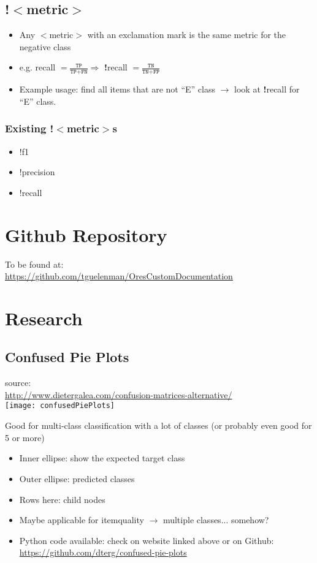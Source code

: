 \documentclass[12pt,a4paper]{article}
\begin{document}
\subsection{!$<$metric$>$}
\begin{itemize}
\item Any $<$metric$>$ with an exclamation mark is the same metric for the negative class
\item e.g. recall $= \frac{\texttt{TP}}{\texttt{TP} + \texttt{FN}} \Rightarrow$ \textbf{!}recall  $= \frac{\texttt{TN}}{\texttt{TN} + \texttt{FP}}$
\item Example usage: find all items that are not ``E'' class $\rightarrow$ look at \textbf{!}recall for ``E'' class.
\end{itemize}
\subsubsection{Existing !$<$metric$>$s}
\begin{itemize}
\item !f1
\item !precision
\item !recall
\end{itemize}
\section{Github Repository}
To be found at:\\
\url{https://github.com/tguelenman/OresCustomDocumentation}

\section{Research}
\subsection{Confused Pie Plots}
source:\\
\url{http://www.dietergalea.com/confusion-matrices-alternative/}\\
\texttt{[image: confusedPiePlots]}
\begin{description}
\item Good for multi-class classification with a lot of classes (or probably even good for 5 or more)
\end{description}
\begin{itemize}
\item Inner ellipse: show the expected target class
\item Outer ellipse: predicted classes
\item Rows here: child nodes
\item Maybe applicable for itemquality $\rightarrow$ multiple classes... somehow?
\item Python code available: check on website linked above or on Github:\\ \url{https://github.com/dterg/confused-pie-plots}
\end{itemize}
\end{document}
